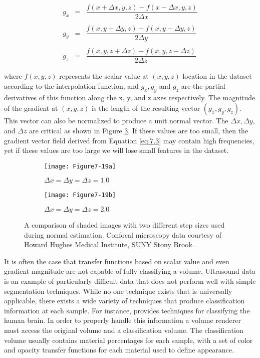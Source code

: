 \begin{equation}\label{eq:7.3}
\begin{array}{lll}
g_x &=& \dfrac{f(x + \Delta x, y, z) - f(x - \Delta x, y, z)}{2 \Delta x} \\ \\
g_y &=& \dfrac{f(x, y + \Delta y, z) - f(x, y - \Delta y, z)}{2 \Delta y} \\ \\
g_z &=& \dfrac{f(x, y, z + \Delta z) - f(x, y, z - \Delta z)}{2 \Delta z}
\end{array}
\end{equation}

where $f(x,y,z)$ represents the scalar value at $(x,y,z)$ location in the dataset according to the interpolation function, and $g_x, g_y$ and $g_z$ are the partial derivatives of this function along the x, y, and z axes respectively. The magnitude of the gradient at $(x,y,z)$ is the length of the resulting vector $(g_x, g_y, g_z)$. This vector can also be normalized to produce a unit normal vector. The  $\Delta x, \Delta y, $ and $\Delta z$ are critical as shown in Figure \ref{fig:Figure7-19}. If these values are too small, then  the gradient vector field derived from Equation \ref{eq:7.3} may contain high frequencies, yet if these values are too large we will lose small features in the dataset.

\begin{figure}[!htb]
	\begin{subfigure}[h]{0.48\linewidth}
		\texttt{[image: Figure7-19a]}
		\caption*{$\Delta x = \Delta y = \Delta z = 1.0$}\label{fig:Figure7-19a}
	\end{subfigure}
	\hfill
	\begin{subfigure}[h]{0.48\linewidth}
		\texttt{[image: Figure7-19b]}
		\caption*{$\Delta x = \Delta y = \Delta z = 2.0$}\label{fig:Figure7-19b}
	\end{subfigure}%
	\caption{A comparison of shaded images with two different step sizes used during normal estimation. Confocal microscopy data courtesy of Howard Hughes Medical Institute, SUNY Stony Brook.}\label{fig:Figure7-19}
\end{figure}


It is often the case that transfer functions based on scalar value and even gradient magnitude are not capable of fully classifying a volume. Ultrasound data is an example of particularly difficult data that does not perform well with simple segmentation techniques. While no one technique exists that is universally applicable, there exists a wide variety of techniques that produce classification information at each sample. For instance, \cite{Kikinis96} provides techniques for classifying the human brain. In order to properly handle this information a volume renderer must access the original volume and a classification volume. The classification volume usually contains material percentages for each sample, with a set of color and opacity transfer functions for each material used to define appearance.

